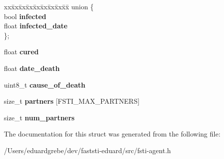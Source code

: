 \begin{DoxyCompactItemize}
\begin{tabbing}
\end{tabbing}\item 
\mbox{\label{structfsti__agent_a52bb574705012b7c4866aab627e81a53}} 
\begin{tabbing}
xx\=xx\=xx\=xx\=xx\=xx\=xx\=xx\=xx\=\kill
union \{\\
\>bool {\bfseries infected}\\
\>float {\bfseries infected\_date}\\
\}; \\

\end{tabbing}\item 
\mbox{\label{structfsti__agent_ad17ed58432c11de69fed459c6bdb4351}} 
float {\bfseries cured}
\item 
\mbox{\label{structfsti__agent_a2f42afcd91c70a986d7a6c786e310260}} 
float {\bfseries date\+\_\+death}
\item 
\mbox{\label{structfsti__agent_a292854517270b640c6fdc35980e66637}} 
uint8\+\_\+t {\bfseries cause\+\_\+of\+\_\+death}
\item 
\mbox{\label{structfsti__agent_a318923c6b94c80da4f27fdad77c711ab}} 
size\+\_\+t {\bfseries partners} \mbox{[}F\+S\+T\+I\+\_\+\+M\+A\+X\+\_\+\+P\+A\+R\+T\+N\+E\+RS\mbox{]}
\item 
\mbox{\label{structfsti__agent_aedbbb1bf31d18d91dd6b05f6d217755e}} 
size\+\_\+t {\bfseries num\+\_\+partners}
\end{DoxyCompactItemize}


The documentation for this struct was generated from the following file\+:\begin{DoxyCompactItemize}
\item 
/\+Users/eduardgrebe/dev/faststi-\/eduard/src/fsti-\/agent.\+h\end{DoxyCompactItemize}
